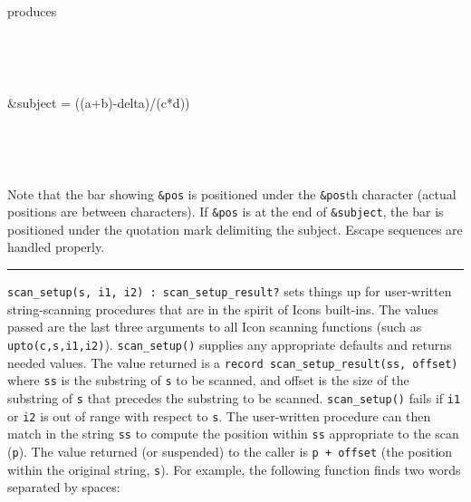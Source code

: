 \noindent produces


{\ttfamily
{\textbar}
\ \ \ \ \ \ \ \ \ \ \ \ \ \ \ \ \ \ \ \ \ \ \ \ \ \ \ \ \ \ \ \ \ \ {\textbar}}

{\ttfamily
{\textbar}
\ \ \ \ \ \ \ \ \ \ \ \ \ \ \ \ \ \ \ \ \ \ \ \ \ \ \ \ \ \ \ \ \ \ {\textbar}}

{\ttfamily
{\textbar} \&subject =
{\textquotedbl}((a+b)-delta)/(c*d)){\textquotedbl} {\textbar}}

{\ttfamily
{\textbar} \ \ \ \ \ \ \ \ \ \ \ \ \ \ \ \ \ \ \ \ \ \ \ \ \ {\textbar}
\ \ \ \ \ \ \ {\textbar}}

{\ttfamily
{\textbar}
\ \ \ \ \ \ \ \ \ \ \ \ \ \ \ \ \ \ \ \ \ \ \ \ \ \ \ \ \ \ \ \ \ \ {\textbar}}

\iconcode{
{}-{}-{}-{}-{}-{}-{}-{}-{}-{}-{}-{}-{}-{}-{}-{}-{}-{}-{}-{}-{}-{}-{}-{}-{}-{}-{}-{}-{}-{}-{}-{}-{}-{}-{}-{}-{}-}

Note that the bar showing \texttt{\&pos} is positioned under the
\texttt{\&pos{\textquotesingle}}th character (actual positions are
between characters). If \texttt{\&pos} is at the end of
\texttt{\&subject}, the bar is positioned under the quotation mark
delimiting the subject. Escape sequences are handled properly. 



\vspace{0.25cm}\hrule{}

\texttt{scan\_setup(s, i1, i2) : scan\_setup\_result?} sets things up
for user-written string-scanning procedures that are in the spirit of
Icon{\textquotesingle}s built-ins. The values passed are the last three
arguments to all Icon scanning functions (such as
\texttt{upto(c,s,i1,i2)}). \texttt{scan\_setup()} supplies any
appropriate defaults and returns needed values. The value returned is a
\texttt{record scan\_setup\_result(ss, offset)}
where \texttt{ss} is the substring of \texttt{s} to be scanned, and
offset is the size of the substring of \texttt{s} that precedes the
substring to be scanned. \texttt{scan\_setup()} fails if \texttt{i1} or
\texttt{i2} is out of range with respect to \texttt{s}. The
user-written procedure can then match in the string \texttt{ss} to
compute the position within \texttt{ss} appropriate to the scan
(\texttt{p}). The value returned (or suspended) to the caller is
\texttt{p + offset} (the position within the original string,
\texttt{s}). For example, the following function finds two words
separated by spaces:

